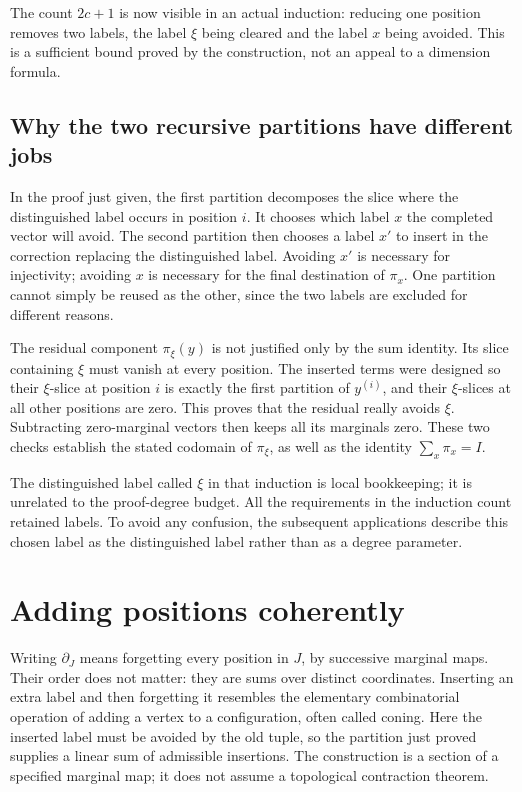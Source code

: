 The count $2c+1$ is now visible in an actual induction: reducing one position removes two labels, the label $\xi$ being cleared and the label $x$ being avoided. This is a sufficient bound proved by the construction, not an appeal to a dimension formula.

\subsection{Why the two recursive partitions have different jobs}
In the proof just given, the first partition decomposes the slice
where the distinguished label occurs in position $i$. It chooses
which label $x$ the completed vector will avoid. The second partition
then chooses a label $x'$ to insert in the correction replacing the
distinguished label. Avoiding $x'$ is necessary for injectivity;
avoiding $x$ is necessary for the final destination of $\pi_x$.
One partition cannot simply be reused as the other, since the two
labels are excluded for different reasons.

The residual component $\pi_\xi(y)$ is not justified only by the sum
identity. Its slice containing $\xi$ must vanish at every position.
The inserted terms were designed so their $\xi$-slice at position $i$
is exactly the first partition of $y^{(i)}$, and their $\xi$-slices at
all other positions are zero. This proves that the residual really
avoids $\xi$. Subtracting zero-marginal vectors then keeps all its
marginals zero. These two checks establish the stated codomain of
$\pi_\xi$, as well as the identity $\sum_x\pi_x=I$.

The distinguished label called $\xi$ in that induction is local
bookkeeping; it is unrelated to the proof-degree budget. All the
requirements in the induction count retained labels. To avoid any
confusion, the subsequent applications describe this chosen label
as the distinguished label rather than as a degree parameter.

\section{Adding positions coherently}\label{tx:sec:cone}
Writing $\partial_J$ means forgetting every position in $J$, by
successive marginal maps. Their order does not matter: they are sums
over distinct coordinates. Inserting an extra label and then forgetting
it resembles the elementary combinatorial operation of adding a vertex
to a configuration, often called coning. Here the inserted label must
be avoided by the old tuple, so the partition just proved supplies a
linear sum of admissible insertions. The construction is a section of
a specified marginal map; it does not assume a topological contraction
theorem.


